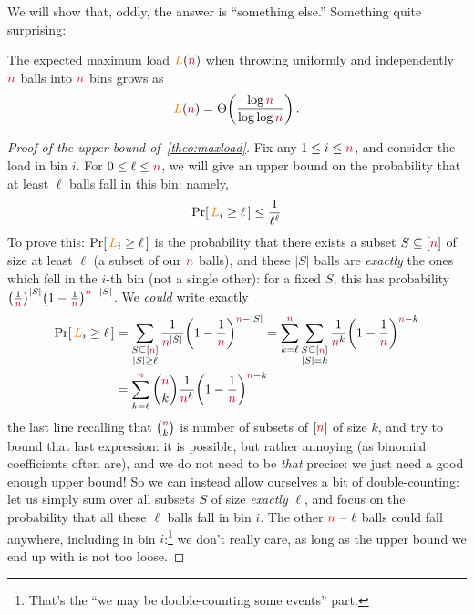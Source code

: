 We will show that, oddly, the answer is ``something else.'' Something quite surprising:
\begin{theorem}
    \label{theo:maxload}
    The expected maximum load $\textcolor{orange}{L}(\textcolor{purple}{n})$ when throwing uniformly and independently $\textcolor{purple}{n}$ balls into $\textcolor{purple}{n}$ bins grows as
    \[
        \orange{L}(\nbins) = \bigTheta{\frac{\log\nbins}{\log\log\nbins}}\,.
    \]
\end{theorem}
\begin{proof}[Proof of the upper bound of~\cref{theo:maxload}]
Fix any $1\leq i\leq \textcolor{purple}{n}$, and consider the load in bin $i$. For $0\leq \ell\leq \textcolor{purple}{n}$, we will give an upper bound on the probability that at least $\ell$ balls fall in this bin: namely, 
\begin{equation}
    \probaOf{\orange{L}_i \geq \ell} 
    \leq \frac{1}{\ell^\ell} 
\end{equation}
To prove this: $\probaOf{\orange{L}_i \geq \ell}$ is the probability that there exists a subset $S\subseteq[\textcolor{purple}{n}]$ of size at least $\ell$ (a subset of our $\textcolor{purple}{n}$ balls), and these $|S|$ balls are \emph{exactly} the ones which fell in the $i$-th bin (not a single other): for a fixed $S$, this has probability $\Paren{\frac{1}{\nbins}}^{|S|}\Paren{1-\frac{1}{\nbins}}^{\nbins-|S|}$. We \emph{could} write exactly
\begin{align*}
    \probaOf{\orange{L}_i \geq \ell} 
    &=
    \sum_{\substack{S\subseteq [\nbins]\\ |S| \geq \ell}} \frac{1}{\nbins^{|S|}}\Paren{1-\frac{1}{\nbins}}^{\nbins-|S|} 
    = \sum_{k=\ell}^{\nbins} \sum_{\substack{S\subseteq [\nbins]\\ |S| = k}} \frac{1}{\nbins^{k}}\Paren{1-\frac{1}{\nbins}}^{\nbins-k} \\
    &= \sum_{k=\ell}^{\nbins} \binom{\nbins}{k}\frac{1}{\nbins^{k}}\Paren{1-\frac{1}{\nbins}}^{\nbins-k} %
\end{align*}
the last line recalling that $\binom{\textcolor{purple}{n}}{k}$ is number of subsets of $[{\textcolor{red}{n}}]$ of size $k$, and try to bound that last expression: it is possible, but rather annoying (as binomial coefficients often are), and we do not need to be \emph{that} precise: we just need a good enough upper bound! So we can instead allow ourselves a bit of double-counting: let us simply sum over all subsets $S$ of size \emph{exactly} $\ell$, and focus on the probability that all these $\ell$ balls fall in bin $i$. The other ${\textcolor{red}{n}}-\ell$ balls could fall anywhere, including in bin $i$:\footnote{That's the ``we may be double-counting some events'' part.} we don't really care, as long as the upper bound we end up with is not too loose.

\end{proof}
